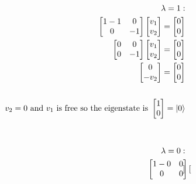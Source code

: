 \documentclass{article}
\begin{document}
\begin{align*}
    \begin{split}
        \lambda = 1: \\
        \begin{bmatrix}
            1 - 1  & 0 \\
            0 & -1
        \end{bmatrix}
        \begin{bmatrix}
            v_1 \\
            v_2
        \end{bmatrix} =
        \begin{bmatrix}
            0 \\
            0
        \end{bmatrix} \\
        \begin{bmatrix}
            0 & 0 \\
            0 & -1
        \end{bmatrix}
        \begin{bmatrix}
            v_1 \\
            v_2
        \end{bmatrix} =
        \begin{bmatrix}
            0 \\
            0
        \end{bmatrix} \\
        \begin{bmatrix}
            0 \\
            -v_2
        \end{bmatrix} 
        = \begin{bmatrix} 0 \\ 0 \end{bmatrix} \\\\
        v_2 = 0 \text{ and } v_1 \text{ is free so the eigenstate is } \begin{bmatrix} 1 \\ 0 \end{bmatrix} = \ket{0} \\\\\\
        \lambda = 0: \\
        \begin{bmatrix}
            1 - 0  & 0 \\
            0 & 0
        \end{bmatrix}
        \begin{bmatrix}

\end{bmatrix}
\end{split}
\end{align*}
\end{document}
